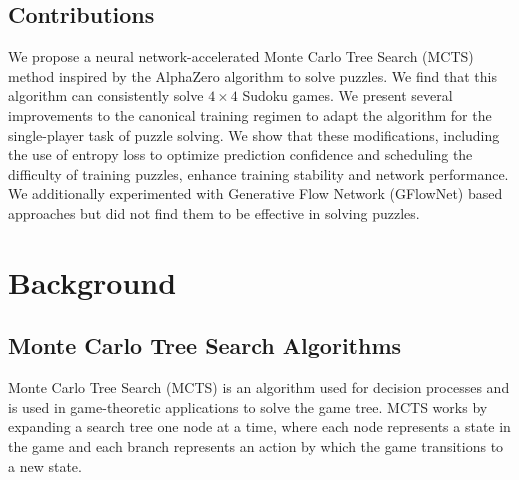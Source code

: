 \documentclass[10pt, reqno, letterpaper, twoside]{amsart}
\begin{document}
\subsection{Contributions}
We propose a neural network-accelerated Monte Carlo Tree Search (MCTS) method inspired by the AlphaZero algorithm to solve puzzles. We find that this algorithm can consistently solve $4 \times 4$ Sudoku games. We present several improvements to the canonical training regimen to adapt the algorithm for the single-player task of puzzle solving. We show that these modifications, including the use of entropy loss to optimize prediction confidence and scheduling the difficulty of training puzzles, enhance training stability and network performance.  We additionally experimented with Generative Flow Network (GFlowNet) based approaches \cite{bengio2023gflownet}\cite{jain2023biological}\cite{zhang2022generative}\cite{zhang2023unifying} but did not find them to be effective in solving puzzles. 

\section{Background}

\subsection{Monte Carlo Tree Search Algorithms}
Monte Carlo Tree Search (MCTS) is an algorithm used for decision processes and is used in game-theoretic applications to solve the game tree. MCTS works by expanding a search tree one node at a time, where each node represents a state in the game and each branch represents an action by which the game transitions to a new state.
\end{document}
